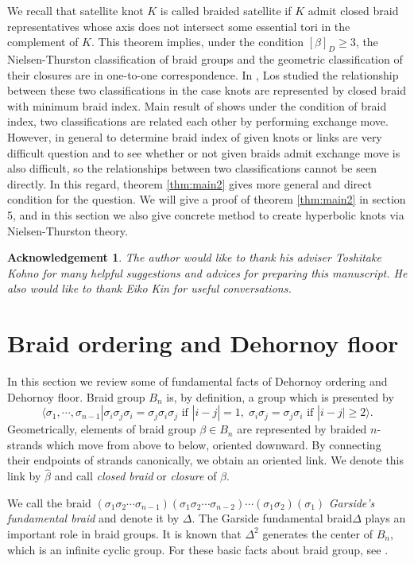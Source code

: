 \documentclass[12pt]{amsart}
\newtheorem{ack}{Acknowledgement}}
\begin{document}
   We recall that satellite knot $K$ is called braided satellite if $K$ admit closed braid representatives whose axis does not intersect some essential tori in the complement of $K$.  
   This theorem implies, under the condition $[\beta]_{D} \geq 3$, the Nielsen-Thurston classification of braid groups and the geometric classification of their closures are in one-to-one correspondence.  
   In \cite{l}, Los studied the relationship between these two classifications in the case knots are represented by closed braid with minimum braid index. Main result of \cite{l} shows under the condition of braid index, two classifications are related each other by performing exchange move. However, in general to determine braid index of given knots or links are very difficult question and to see whether or not given braids admit exchange move is also difficult, so the relationships between two classifications cannot be seen directly. In this regard, theorem \ref{thm:main2} gives more general and direct condition for the question.
   We will give a proof of theorem \ref{thm:main2} in section 5, and in this section we also give concrete method to create hyperbolic knots via Nielsen-Thurston theory.
 
\begin{ack}
 The author would like to thank his adviser Toshitake Kohno for many helpful suggestions and advices for preparing this manuscript. He also would like to thank Eiko Kin for useful conversations.
\end{ack}
 
\section{Braid ordering and Dehornoy floor}

   In this section we review some of fundamental facts of Dehornoy ordering and Dehornoy floor.
Braid group $B_{n}$ is, by definition, a group which is presented by
\[ \langle \sigma_{1},\cdots,\sigma_{n-1}| \sigma_{i}\sigma_{j}\sigma_{i}=\sigma_{j}\sigma_{i}\sigma_{j} \textrm{ if } |i-j|=1, \; \sigma_{i}\sigma_{j}=\sigma_{j}\sigma_{i} \textrm{ if } |i-j|\geq 2  \rangle .\]
 Geometrically, elements of braid group $\beta \in B_{n}$ are represented by braided $n$-strands which move from above to below, oriented downward. By connecting their endpoints of strands canonically, we obtain an oriented link. We denote this link by $\widehat{\beta}$ and call {\it closed braid} or {\it closure} of $\beta$.


   We call the braid $(\sigma_{1}\sigma_{2}\cdots\sigma_{n-1})(\sigma_{1}\sigma_{2}\cdots\sigma_{n-2})\cdots(\sigma_{1}\sigma_{2})(\sigma_{1})$ {\it Garside's fundamental braid} and denote it by $\Delta$. The Garside fundamental braid$\Delta$ plays an important role in braid groups. 
 It is known that $\Delta^{2}$ generates the center of $B_{n}$, which is an infinite cyclic group.
 For these basic facts about braid group, see \cite{b}.
 
\end{document}
